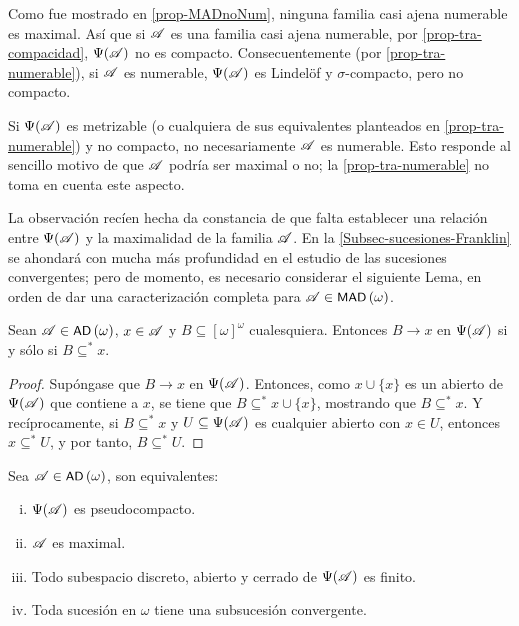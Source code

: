 	Como fue mostrado en \ref{prop-MADnoNum}, ninguna familia casi ajena numerable es maximal. Así que si $\mathscr{A}$ es una familia casi ajena numerable, por \ref{prop-tra-compacidad}, $\Psi(\mathscr{A})$ no es compacto. Consecuentemente (por \ref{prop-tra-numerable}), si $\mathscr{A}$ es numerable, $\Psi(\mathscr{A})$ es Lindelöf y $\sigma$-compacto, pero no compacto.
	
	\begin{observacion}
		Si $\Psi(\mathscr{A})$ es metrizable (o cualquiera de sus equivalentes planteados en \ref{prop-tra-numerable}) y no compacto, no necesariamente $\mathscr{A}$ es numerable. Esto responde al sencillo motivo de que $\mathscr{A}$ podría ser maximal o no; la \autoref{prop-tra-numerable} no toma en cuenta este aspecto.
	\end{observacion}

	La observación recíen hecha da constancia de que falta establecer una relación entre $\Psi(\mathscr{A})$ y la maximalidad de la familia $\mathscr{A}$. En la \autoref{Subsec-sucesiones-Franklin} se ahondará con mucha más profundidad en el estudio de las sucesiones convergentes; pero de momento, es necesario considerar el siguiente Lema, en orden de dar una caracterización completa para $\mathscr{A} \in \operatorname{\text{\textsf{\small MAD}}}\,(\omega)$.
	
	\begin{lema}\label{lem-convObvia}
		Sean $\mathscr{A} \in \operatorname{\text{\textsf{\small AD}}}\,(\omega) $, $x \in \mathscr{A}$ y $B \subseteq [\omega]^\omega$ cualesquiera. Entonces $B \to x$ en $\Psi(\mathscr{A})$ si y sólo si $B \subseteq ^* x$.
	\end{lema}

	\begin{proof} 
		Supóngase que $B \to x$ en $\Psi(\mathscr{A})$. Entonces, como $x \cup \{x\}$ es un abierto de $\Psi(\mathscr{A})$ que contiene a $x$, se tiene que $B \subseteq^* x \cup \{x\}$, mostrando que $B \subseteq^* x$. Y recíprocamente, si $B \subseteq^* x$ y $U \subseteq \Psi(\mathscr{A})$ es cualquier abierto con $x \in U$, entonces $x \subseteq^* U$, y por tanto, $B \subseteq^* U$.
	\end{proof}
	
	\begin{proposicion}\label{prop-tra-pseudoCaract}
		Sea $\mathscr{A} \in \operatorname{\text{\textsf{\small AD}}}\,(\omega)$, son equivalentes:
		\begin{enumerate}[i)]
			\item $\Psi(\mathscr{A})$ es pseudocompacto.
			\item $\mathscr{A}$ es maximal.
			\item Todo subespacio discreto, abierto y cerrado de $\Psi(\mathscr{A})$ es finito.
			\item Toda sucesión en $\omega$ tiene una subsucesión convergente.
		\end{enumerate}
	\end{proposicion}
	
